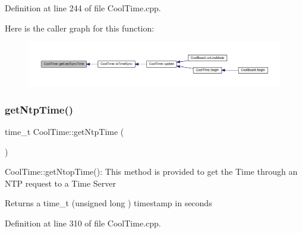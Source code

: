 Definition at line 244 of file Cool\+Time.\+cpp.

Here is the caller graph for this function\+:\nopagebreak
\begin{figure}[H]
\begin{center}
\leavevmode
\includegraphics[width=350pt]{class_cool_time_a5d17f707a9d337720493b2bce9d41c21_icgraph}
\end{center}
\end{figure}
\mbox{\label{class_cool_time_a41fbbbfd651c2079f54d4b2911e4c705}} 
\subsubsection{\texorpdfstring{get\+Ntp\+Time()}{getNtpTime()}}
{\footnotesize\ttfamily time\+\_\+t Cool\+Time\+::get\+Ntp\+Time (\begin{DoxyParamCaption}{ }\end{DoxyParamCaption})}

Cool\+Time\+::get\+Ntop\+Time()\+: This method is provided to get the Time through an N\+TP request to a Time Server

\begin{DoxyReturn}{Returns}
a time\+\_\+t (unsigned long ) timestamp in seconds 
\end{DoxyReturn}


Definition at line 310 of file Cool\+Time.\+cpp.

